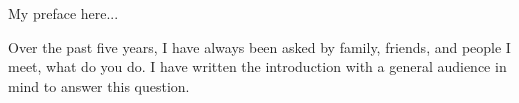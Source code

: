 My preface here...

Over the past five years, I have always been asked by family, friends, 
and people I meet, what do you do.
I have written the introduction with a general audience in mind to answer this
question.
